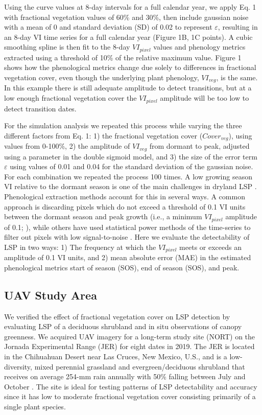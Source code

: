 \documentclass{article}
\begin{document}
Using the curve values at 8-day intervals for a full calendar year, we apply Eq. 1 with fractional vegetation values of 60\% and 30\%, then include gaussian noise with a mean of 0 and standard deviation (SD) of 0.02 to represent $\varepsilon$, resulting in an 8-day VI time series for a full calendar year (Figure 1B, 1C points). A cubic smoothing spline is then fit to the 8-day $VI_{pixel}$ values and phenology metrics extracted using a threshold of 10\% of the relative maximum value. Figure 1 shows how the phenological metrics change due solely to differences in fractional vegetation cover, even though the underlying plant phenology, $VI_{veg}$, is the same. In this example there is still adequate amplitude to detect transitions, but at a low enough fractional vegetation cover the $VI_{pixel}$ amplitude will be too low to detect transition dates.

For the simulation analysis we repeated this process while varying the three different factors from Eq. 1: 1) the fractional vegetation cover ($Cover_{veg}$), using values from 0-100\%, 2) the amplitude of $VI_{veg}$ from dormant to peak, adjusted using a parameter in the double sigmoid model, and 3) the size of the error term $\varepsilon$ using values of 0.01 and 0.04 for the standard deviation of the gaussian noise. For each combination we repeated the process 100 times. A low growing season VI relative to the dormant season is one of the main challenges in dryland LSP \cite{smith2019}. Phenological extraction methods account for this in several ways. A common approach is discarding pixels which do not exceed a threshold of 0.1 VI units between the dormant season and peak growth (i.e., a minimum $VI_{pixel}$ amplitude of 0.1; \cite{white2009, jeong2011, garonna2016, gray2019}), while others have used statistical power methods of the time-series to filter out pixels with low signal-to-noise \cite{dannenberg2017}. Here we evaluate the detectability of LSP in two ways: 1) The frequency at which the $VI_{pixel}$ meets or exceeds an amplitude of 0.1 VI units, and 2) mean absolute error (MAE) in the estimated phenological metrics start of season (SOS), end of season (SOS), and peak. 

\subsection{UAV Study Area}

We verified the effect of fractional vegetation cover on LSP detection by evaluating LSP of a deciduous shrubland and in situ observations of canopy greenness. We acquired UAV imagery for a long-term study site (NORT) on the Jornada Experimental Range (JER) for eight dates in 2019. The JER is located in the Chihuahuan Desert near Las Cruces, New Mexico, U.S., and is a low-diversity, mixed perennial grassland and evergreen/deciduous shrubland that receives on average 254-mm rain annually with 50\% falling between July and October \cite{browning2015}. The site is ideal for testing patterns of LSP detectability and accuracy since it has low to moderate fractional vegetation cover consisting primarily of a single plant species.
\end{document}
